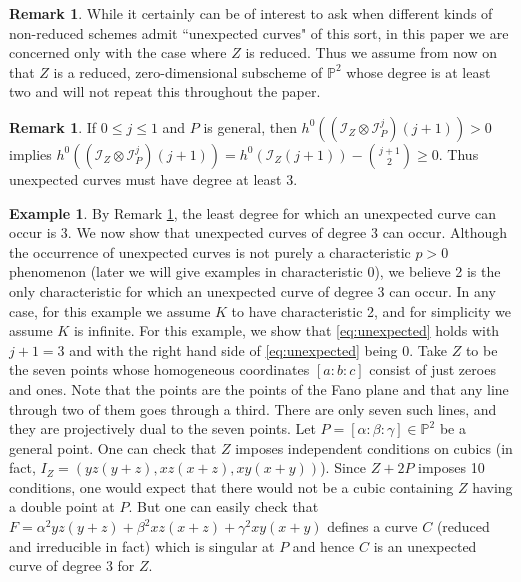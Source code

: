 \documentclass[12pt]{amsart}
\numberwithin{equation}{section}
\theoremstyle{definition}
\newtheorem{example}[theorem]{Example}
\newtheorem{remark}[theorem]{Remark}
\begin{document}
\begin{remark}
While it certainly can be of interest to ask when different kinds of non-reduced schemes admit ``unexpected curves" of this sort, in this paper we are concerned only with the case where $Z$ is reduced. Thus we assume from now on that $Z$ is a reduced, zero-dimensional subscheme of $\mathbb P^2$ whose degree is at least two  and will not repeat this throughout the paper.
\end{remark}

\begin{remark} \label{interesting}
If $0\leq j\leq1$ and $P$ is general, then $h^0((\mathcal I_Z \otimes \mathcal I_P^j)(j+1)) > 0$ implies
$h^0((\mathcal I_Z \otimes \mathcal I_P^j)(j+1)) = h^0(\mathcal I_Z(j+1)) - \binom{j+1}{2}\geq 0$.
Thus unexpected curves must have degree at least 3. 
\end{remark}

\begin{example}\label{FanoExample}
By Remark \ref{interesting}, the least degree for which an unexpected curve can occur is 3. 
We now show that unexpected curves of degree 3 can occur. 
Although the occurrence of unexpected curves is not purely a characteristic $p>0$ phenomenon
(later we will give examples in characteristic 0), we believe 2 is the only characteristic for which
an unexpected curve of degree 3 can occur. In any case, for this example
we assume $K$ to have characteristic 2, and for simplicity we assume $K$ is infinite. 
For this example, we show that \eqref{eq:unexpected} holds with $j+1=3$ and with the right hand side of \eqref{eq:unexpected} being 0.
Take $Z$ to be the seven points whose homogeneous coordinates $[a:b:c]$ consist of just zeroes and ones.
Note that the points are the points of the Fano plane and that any line through two of them goes through a third.
There are only seven such lines, and they are projectively dual to the seven points.
Let $P=[\alpha:\beta:\gamma]\in { \ensuremath{\mathbb{P}}}^2$ be a general point. One can check that
$Z$ imposes independent conditions on cubics (in fact, 
$I_Z=(yz(y + z),xz(x + z),xy(x + y))$). Since $Z+2P$ imposes 10 conditions,
one would expect that there would not be a cubic containing $Z$ having a double point at $P$.
But one can easily check that $F=\alpha^2yz(y + z)+\beta^2xz(x + z)+\gamma^2xy(x + y)$ defines a curve $C$ 
(reduced and irreducible in fact) which
is singular at $P$ and hence $C$ is an unexpected curve of degree 3 for $Z$.
\end{example}
\end{document}
